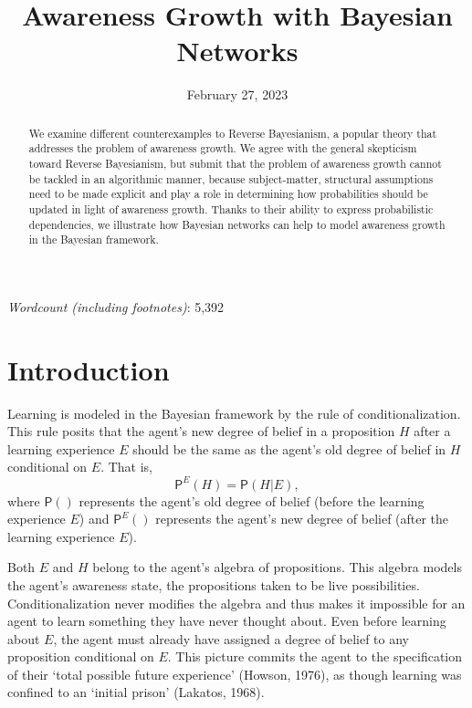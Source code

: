 \documentclass[
  11pt,
  dvipsnames,enabledeprecatedfontcommands]{scrartcl}
\title{Awareness Growth with Bayesian Networks}
\author{}
\date{\vspace{-2.5em}February 27, 2023}
\newcommand{\pr}[1]{\ensuremath{\mathsf{P}(#1)}}
\newcommand{\ppr}[2]{\ensuremath{\mathsf{P}^{#1}(#2)}}
\begin{document}
\maketitle

\doublespace

\emph{Wordcount (including footnotes)}: 5,392

\begin{abstract}
We examine different counterexamples to Reverse Bayesianism, a popular theory 
that addresses the problem of awareness growth. We agree with the general skepticism toward Reverse Bayesianism, but submit that the problem of awareness growth cannot be tackled in an algorithmic manner, because subject-matter, structural assumptions need to be made explicit and play a role in determining how probabilities should be updated in light of awareness growth. Thanks to their ability to express probabilistic dependencies, we illustrate how Bayesian networks can help to model awareness growth in the Bayesian framework. 
\end{abstract}

\doublespace
\linenumbers

\hypertarget{introduction}{%
\section{Introduction}\label{introduction}}

Learning is modeled in the Bayesian framework by the rule of
conditionalization. This rule posits that the agent's new degree of
belief in a proposition \(H\) after a learning experience \(E\) should
be the same as the agent's old degree of belief in \(H\) conditional on
\(E\). That is, \[\ppr{E}{H}=\pr{H \vert E},\] where \(\pr{}\)
represents the agent's old degree of belief (before the learning
experience \(E\)) and \(\ppr{E}{}\) represents the agent's new degree of
belief (after the learning experience \(E\)).

Both \(E\) and \(H\) belong to the agent's algebra of propositions. This
algebra models the agent's awareness state, the propositions taken to be
live possibilities. Conditionalization never modifies the algebra and
thus makes it impossible for an agent to learn something they have never
thought about. Even before learning about \(E\), the agent must already
have assigned a degree of belief to any proposition conditional on
\(E\). This picture commits the agent to the specification of their
`total possible future experience' (Howson, 1976), as though learning
was confined to an `initial prison' (Lakatos, 1968).
\end{document}
